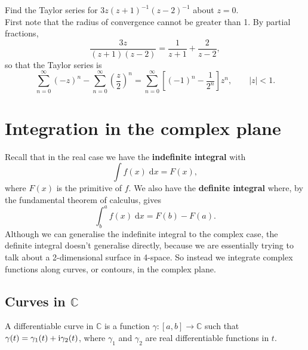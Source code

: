\documentclass[letter-paper]{tufte-book}
\newenvironment{example}[1][Example]{\begin{trivlist}
\item[\hskip \labelsep {\bfseries #1}]}{\end{trivlist}}
\newcommand{\zi}{{\rm i}}
\newcommand\Def[1]{\textbf{#1}}
\begin{document}
\begin{example}
  Find the Taylor series for $3z(z+1)^{-1}(z-2)^{-1}$ about $z = 0$.\\
  
  First note that the radius of convergence cannot be greater than 1. By partial
  fractions,
  \begin{equation*}
    \frac{3z}{(z+1)(z-2)} = \frac{1}{z+1} + \frac{2}{z-2},
  \end{equation*}
  so that the Taylor series is
  \begin{equation*}
    \sum^\infty_{n=0} (-z)^n - \sum^\infty_{n=0} \left(\frac{z}{2}\right)^n = \sum^\infty_{n=0} \left[(-1)^n - \frac{1}{2^n}\right] z^n, \qquad |z| < 1.
  \end{equation*}
\end{example}


\chapter{Integration in the complex plane}

Recall that in the real case we have the \Def{indefinite integral} with
\begin{equation*}
  \int f(x)\; \mathrm{d}x = F(x),
\end{equation*}
where $F(x)$ is the primitive of $f$. We also have the \Def{definite integral}
where, by the fundamental theorem of calculus, gives
\begin{equation*}
  \int^a_b f(x)\; \mathrm{d}x = F(b) - F(a).
\end{equation*}
Although we can generalise the indefinite integral to the complex case, the
definite integral doesn't generalise directly, because we are essentially trying
to talk about a 2-dimensional surface in 4-space. So instead we integrate
complex functions along curves, or contours, in the complex plane.


\section{Curves in $\mathbb{C}$}

A differentiable curve in $\mathbb{C}$ is a function $\gamma : [a, b] \to
\mathbb{C}$ such that $\gamma(t) = \gamma_1(t) + \zi \gamma_2 (t)$, where
$\gamma_1$ and $\gamma_2$ are real differentiable functions in $t$.
\end{document}
